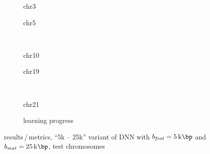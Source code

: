\begin{figure}[p]
    \begin{subfigure}{0.45\textwidth}
        \scriptsize
        \caption{chr3}
    \end{subfigure} \hfill
    \begin{subfigure}{0.45\textwidth}
        \scriptsize
        \caption{chr5}
    \end{subfigure}\\[5mm]
    \begin{subfigure}{0.45\textwidth}
        \scriptsize
        \caption{chr10}
    \end{subfigure}\hfill
    \begin{subfigure}{0.45\textwidth}
        \scriptsize
        \caption{chr19}
    \end{subfigure}\\[3mm]
    \centering
    \begin{subfigure}{0.45\textwidth}
        \scriptsize
        \caption{chr21}
    \end{subfigure}\hfill
    \begin{subfigure}{0.45\textwidth}
        \caption{learning progress} \label{fig:results:25k5DNN_lossEpochs}
    \end{subfigure}
    \caption{results\,/\,metrics, ``5k -- 25k'' variant of DNN with $b_\mathit{feat}=\SI{5}{\kilo\bp}$ and $b_\mathit{mat}=\SI{25}{\kilo\bp}$,  test chromosomes}
    \label{fig:results:25k5DNN_pearson}
\end{figure}


